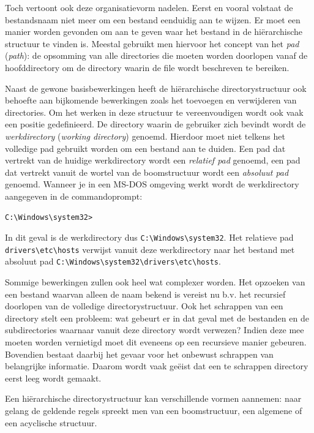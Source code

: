 Toch vertoont ook deze organisatievorm nadelen. Eerst en vooral
volstaat de bestandsnaam niet meer om een bestand eenduidig aan te
wijzen. Er moet een manier worden gevonden om aan te geven waar het
bestand in de hi\"erarchische structuur te vinden is. Meestal gebruikt
men hiervoor het concept van het \emph{pad} (\emph{path}): de
opsomming van alle directories die moeten worden doorlopen vanaf de
hoofddirectory om de directory waarin de file wordt beschreven te
bereiken.

Naast de gewone basisbewerkingen heeft de hi\"erarchische
directorystructuur ook behoefte aan bijkomende bewerkingen zoals het
toevoegen en verwijderen van directories. Om het werken in deze
structuur te vereenvoudigen wordt ook vaak een positie gedefinieerd.
De directory waarin de gebruiker zich bevindt wordt de
\emph{werkdirectory} (\emph{working
directory}) genoemd. Hierdoor moet niet telkens het
volledige pad gebruikt worden om een bestand aan te duiden. Een pad
dat vertrekt van de huidige werkdirectory wordt een
\emph{relatief pad} genoemd, een pad dat vertrekt
vanuit de wortel van de boomstructuur wordt een \emph{absoluut
pad} genoemd. Wanneer je in een MS-DOS omgeving werkt wordt
de werkdirectory aangegeven in de commandoprompt:

\begin{verbatim}
C:\Windows\system32>
\end{verbatim}

In dit geval is de werkdirectory dus \verb|C:\Windows\system32|. Het
relatieve pad \verb|drivers\etc\hosts| verwijst vanuit deze werkdirectory
naar het bestand met absoluut pad \verb|C:\Windows\system32\drivers\etc\hosts|.

Sommige bewerkingen zullen ook heel wat complexer worden. Het
opzoeken van een bestand waarvan alleen de naam bekend is vereist nu
b.v. het recursief doorlopen van de volledige directorystructuur. Ook
het schrappen van een directory stelt een probleem: wat gebeurt er in
dat geval met de bestanden en de subdirectories waarnaar vanuit deze
directory wordt verwezen? Indien deze mee moeten worden vernietigd
moet dit eveneens op een recursieve manier gebeuren. Bovendien bestaat
daarbij het gevaar voor het onbewust schrappen van belangrijke
informatie. Daarom wordt vaak ge\"eist dat een te schrappen directory
eerst leeg wordt gemaakt.

Een hi\"erarchische directorystructuur kan verschillende vormen
aannemen: naar gelang de geldende regels spreekt men van een
boomstructuur, een algemene of een acyclische structuur.

